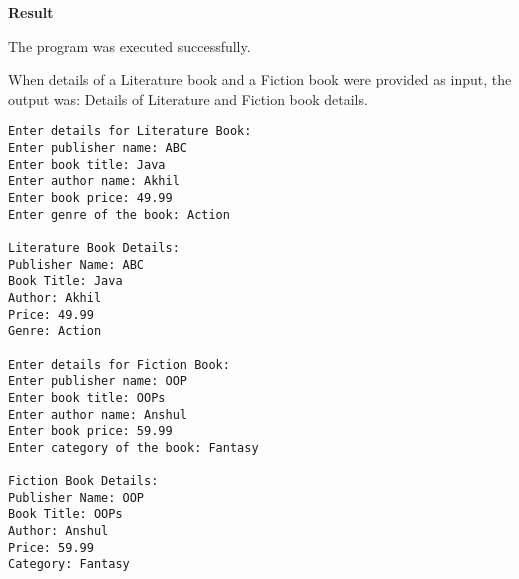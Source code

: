 \vspace{0.5cm}
\textbf{Result}
\vspace{0.5cm}

The program was executed successfully. 

When details of a Literature book and a Fiction book were provided as input, the output was: Details of Literature and Fiction book details.
\begin{verbatim}
Enter details for Literature Book:
Enter publisher name: ABC
Enter book title: Java
Enter author name: Akhil
Enter book price: 49.99
Enter genre of the book: Action     

Literature Book Details:
Publisher Name: ABC
Book Title: Java
Author: Akhil
Price: 49.99
Genre: Action

Enter details for Fiction Book:
Enter publisher name: OOP
Enter book title: OOPs
Enter author name: Anshul 
Enter book price: 59.99
Enter category of the book: Fantasy

Fiction Book Details:
Publisher Name: OOP
Book Title: OOPs
Author: Anshul
Price: 59.99
Category: Fantasy
\end{verbatim}

